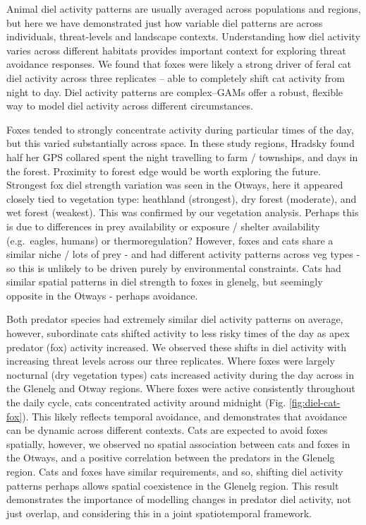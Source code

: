 \documentclass[11pt,a4paper,titlepage,twoside,openright]{style/unimelbthesis}
\begin{document}
\begin{mainmatter}
Animal diel activity patterns are usually averaged across populations and regions, but here we have demonstrated just how variable diel patterns are across individuals, threat-levels and landscape contexts. Understanding how diel activity varies across different habitats provides important context for exploring threat avoidance responses. We found that foxes were likely a strong driver of feral cat diel activity across three replicates -- able to completely shift cat activity from night to day. Diel activity patterns are complex--GAMs offer a robust, flexible way to model diel activity across different circumstances.

Foxes tended to strongly concentrate activity during particular times of the day, but this varied substantially across space. In these study regions, Hradsky found half her GPS collared spent the night travelling to farm / townships, and days in the forest. Proximity to forest edge would be worth exploring the future. Strongest fox diel strength variation was seen in the Otways, here it appeared closely tied to vegetation type: heathland (strongest), dry forest (moderate), and wet forest (weakest). This was confirmed by our vegetation analysis. Perhaps this is due to differences in prey availability or exposure / shelter availability (e.g.~eagles, humans) or thermoregulation? However, foxes and cats share a similar niche / lots of prey - and had different activity patterns across veg types - so this is unlikely to be driven purely by environmental constraints. Cats had similar spatial patterns in diel strength to foxes in glenelg, but seemingly opposite in the Otways - perhaps avoidance.

Both predator species had extremely similar diel activity patterns on average, however, subordinate cats shifted activity to less risky times of the day as apex predator (fox) activity increased. We observed these shifts in diel activity with increasing threat levels across our three replicates. Where foxes were largely nocturnal (dry vegetation types) cats increased activity during the day across in the Glenelg and Otway regions. Where foxes were active consistently throughout the daily cycle, cats concentrated activity around midnight (Fig. \ref{fig:diel-cat-fox}). This likely reflects temporal avoidance, and demonstrates that avoidance can be dynamic across different contexts. Cats are expected to avoid foxes spatially, however, we observed no spatial association between cats and foxes in the Otways, and a positive correlation between the predators in the Glenelg region. Cats and foxes have similar requirements, and so, shifting diel activity patterns perhaps allows spatial coexistence in the Glenelg region. This result demonstrates the importance of modelling changes in predator diel activity, not just overlap, and considering this in a joint spatiotemporal framework.


\end{mainmatter}
\end{document}
